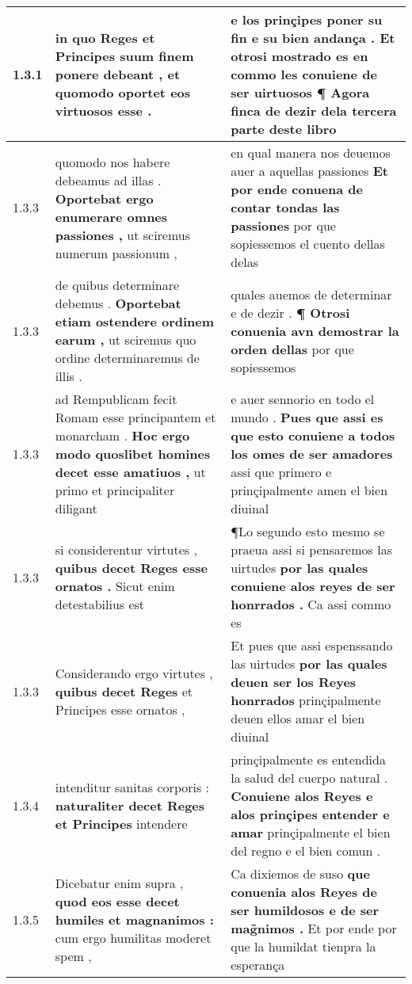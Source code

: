 \begin{tabular}{|p{1cm}|p{6.5cm}|p{6.5cm}|}
1.3.1 & in quo Reges et Principes suum finem ponere debeant , \textbf{ et quomodo oportet } eos virtuosos esse . & e los prinçipes poner su fin e su bien andança . \textbf{ Et otrosi mostrado es en commo les conuiene de ser uirtuosos } ¶ Agora finca de dezir dela tercera parte deste libro \\\hline
1.3.3 & quomodo nos habere debeamus ad illas . \textbf{ Oportebat ergo enumerare omnes passiones , } ut sciremus numerum passionum , & en qual manera nos deuemos auer a aquellas passiones \textbf{ Et por ende conuena de contar tondas las passiones } por que sopiessemos el cuento dellas delas \\\hline
1.3.3 & de quibus determinare debemus . \textbf{ Oportebat etiam ostendere ordinem earum , } ut sciremus quo ordine determinaremus de illis . & quales auemos de determinar e de dezir . \textbf{ ¶ Otrosi conuenia avn demostrar la orden dellas } por que sopiessemos \\\hline
1.3.3 & ad Rempublicam fecit Romam esse principantem et monarcham . \textbf{ Hoc ergo modo quoslibet homines decet esse amatiuos , } ut primo et principaliter diligant & e auer sennorio en todo el mundo . \textbf{ Pues que assi es que esto conuiene a todos los omes de ser amadores } assi que primero e prinçipalmente amen el bien diuinal \\\hline
1.3.3 & si considerentur virtutes , \textbf{ quibus decet Reges esse ornatos . } Sicut enim detestabilius est & ¶Lo segundo esto mesmo se praeua assi si pensaremos las uirtudes \textbf{ por las quales conuiene alos reyes de ser honrrados . } Ca assi commo es \\\hline
1.3.3 & Considerando ergo virtutes , \textbf{ quibus decet Reges } et Principes esse ornatos , & Et pues que assi espenssando las uirtudes \textbf{ por las quales deuen ser los Reyes honrrados } prinçipalmente deuen ellos amar el bien diuinal \\\hline
1.3.4 & intenditur sanitas corporis : \textbf{ naturaliter decet Reges et Principes } intendere & prinçipalmente es entendida la salud del cuerpo natural . \textbf{ Conuiene alos Reyes e alos prinçipes entender e amar } prinçipalmente el bien del regno e el bien comun . \\\hline
1.3.5 & Dicebatur enim supra , \textbf{ quod eos esse decet humiles et magnanimos : } cum ergo humilitas moderet spem , & Ca dixiemos de suso \textbf{ que conuenia alos Reyes de ser humildosos e de ser mag̃nimos . } Et por ende por que la humildat tienpra la esperança \\\hline

\end{tabular}
